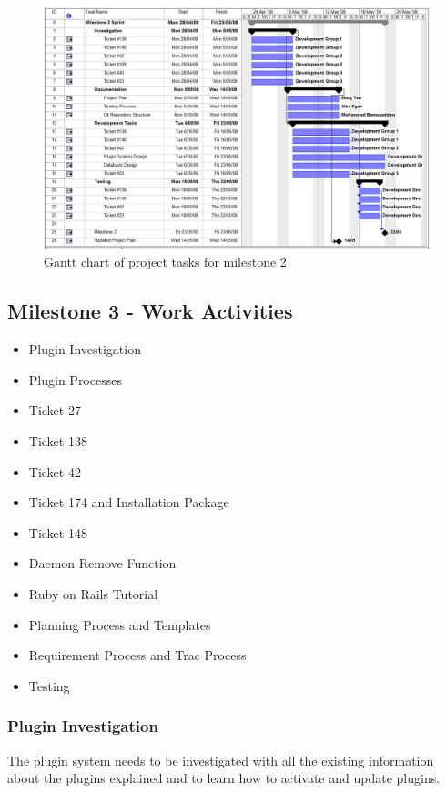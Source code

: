 \documentclass{article}
\begin{document}
\begin{figure}[htp]
\begin{centering}
\includegraphics[angle=90,scale=0.5]{./schedule-milestone2.jpg} 
\par\end{centering}
\caption{Gantt chart of project tasks for milestone 2}
\label{fig:schedule2} 
\end{figure}

\subsection{Milestone 3 - Work Activities}

\begin{itemize}
\item Plugin Investigation
\item Plugin Processes
\item Ticket 27
\item Ticket 138
\item Ticket 42
\item Ticket 174 and Installation Package
\item Ticket 148
\item Daemon Remove Function
\item Ruby on Rails Tutorial
\item Planning Process and Templates
\item Requirement Process and Trac Process
\item Testing
\end{itemize}

\subsubsection{Plugin Investigation}
	The plugin system needs to be investigated with all the existing information about the plugins explained and to learn how to activate and update plugins.\\
	
\end{document}
